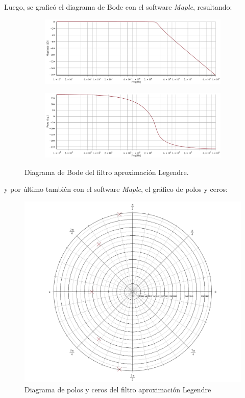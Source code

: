 Luego, se graficó el diagrama de Bode con el software \textit{Maple}, resultando:
\begin{figure}[H]
\centering
	\begin{subfigure}{\textwidth}
	\centering
	\includegraphics[width=\textwidth]{Imagenes-Ej1/legendre_hs.png}
	\end{subfigure}
	
	\begin{subfigure}{\textwidth}
	\centering
	\includegraphics[width=\textwidth]{Imagenes-Ej1/legendre_hspha.png}
	\end{subfigure}
	\label{fig:bodebes}
	\caption{Diagrama de Bode del filtro aproximación Legendre.}
\end{figure}
y por último también con el software \textit{Maple}, el gráfico de polos y ceros:

\begin{figure}[H]
\centering
	\centering
	\includegraphics[width=\textwidth]{Imagenes-Ej1/legendre_poles.png}
	\caption{Diagrama de polos y ceros del filtro aproximación Legendre}
	\label{leg_poles}
\end{figure}

